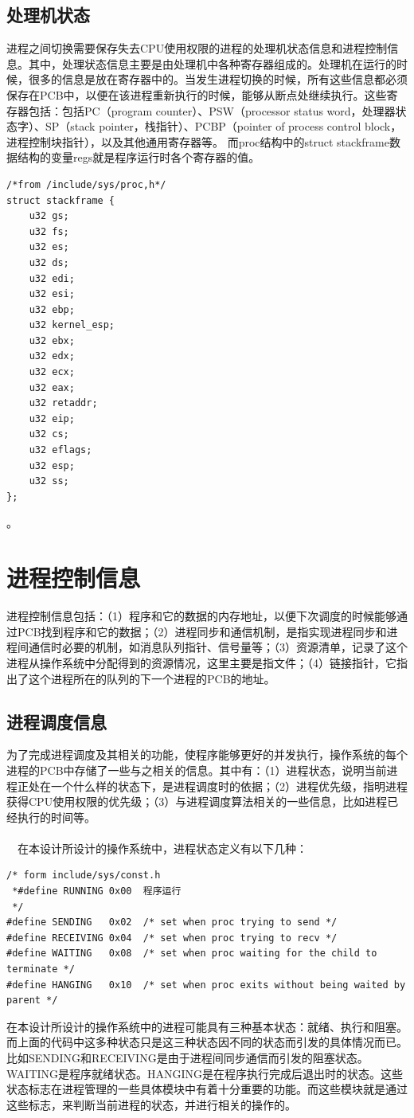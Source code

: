 \documentclass[UTF8,nofonts,cs4size]{ctexrep}
\begin{document}
\subsection{处理机状态}
进程之间切换需要保存失去CPU使用权限的进程的处理机状态信息和进程控制信息。其中，处理状态信息主要是由处理机中各种寄存器组成的。处理机在运行的时候，很多的信息是放在寄存器中的。当发生进程切换的时候，所有这些信息都必须保存在PCB中，以便在该进程重新执行的时候，能够从断点处继续执行。这些寄存器包括：包括PC（program counter）、PSW（processor status word，处理器状态字）、SP（stack pointer，栈指针）、PCBP（pointer of process control block，进程控制块指针），以及其他通用寄存器等。
而proc结构中的struct stackframe数据结构的变量regs就是程序运行时各个寄存器的值。
\begin{lstlisting}
/*from /include/sys/proc,h*/
struct stackframe {	
	u32	gs;		
	u32	fs;		
	u32	es;		
	u32	ds;		
	u32	edi;		
	u32	esi;		
	u32	ebp;		
	u32	kernel_esp;	
	u32	ebx;			
	u32	edx;		
	u32	ecx;		
	u32	eax;		
	u32	retaddr;	
	u32	eip;		
	u32	cs;		
	u32	eflags;		
	u32	esp;		
	u32	ss;		
};
\end{lstlisting}。
\section{进程控制信息}
进程控制信息包括：（1）程序和它的数据的内存地址，以便下次调度的时候能够通过PCB找到程序和它的数据；（2）进程同步和通信机制，是指实现进程同步和进程间通信时必要的机制，如消息队列指针、信号量等；（3）资源清单，记录了这个进程从操作系统中分配得到的资源情况，这里主要是指文件；（4）链接指针，它指出了这个进程所在的队列的下一个进程的PCB的地址。
\subsection{进程调度信息}
为了完成进程调度及其相关的功能，使程序能够更好的并发执行，操作系统的每个进程的PCB中存储了一些与之相关的信息。其中有：（1）进程状态，说明当前进程正处在一个什么样的状态下，是进程调度时的依据；（2）进程优先级，指明进程获得CPU使用权限的优先级；（3）与进程调度算法相关的一些信息，比如进程已经执行的时间等。
\paragraph{}
\indent \ \ 
在本设计所设计的操作系统中，进程状态定义有以下几种：
\begin{lstlisting}
/* form include/sys/const.h
 *#define RUNNING 0x00  程序运行
 */
#define SENDING   0x02	/* set when proc trying to send */
#define RECEIVING 0x04	/* set when proc trying to recv */
#define WAITING   0x08	/* set when proc waiting for the child to terminate */
#define HANGING   0x10	/* set when proc exits without being waited by parent */
\end{lstlisting}
在本设计所设计的操作系统中的进程可能具有三种基本状态：就绪、执行和阻塞。而上面的代码中这多种状态只是这三种状态因不同的状态而引发的具体情况而已。比如SENDING和RECEIVING是由于进程间同步通信而引发的阻塞状态。WAITING是程序就绪状态。HANGING是在程序执行完成后退出时的状态。这些状态标志在进程管理的一些具体模块中有着十分重要的功能。而这些模块就是通过这些标志，来判断当前进程的状态，并进行相关的操作的。
\end{document}

